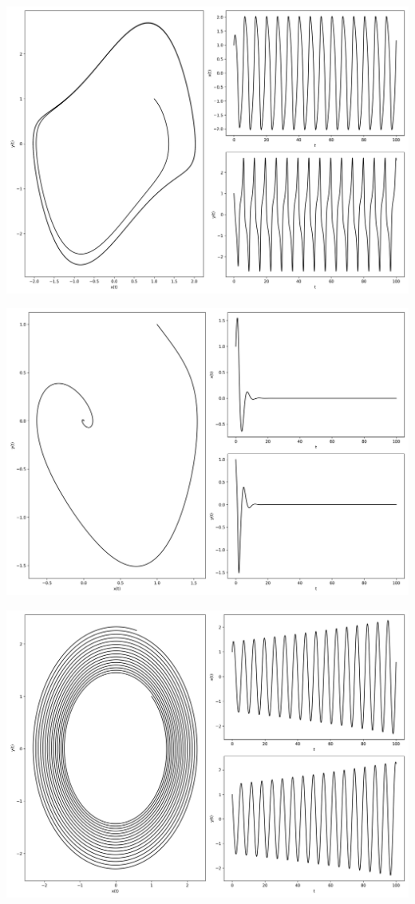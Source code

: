 \documentclass[12pt,a4paper]{jsarticle}
\makeatletter
\def\figcaption{\def\@captype{figure}\caption}
\makeatother
\begin{document}
\figcaption{$x_0=3.00, y_0=3.00, \mu=1,00, \omega=1.00, T = 200, N = 2000$}
\includegraphics[scale=0.33]{x1,0y1,0mu1,0omega1,0t1,00e+02n1,00e+04.png}
\figcaption{$x_0=1,00, y_0=1.00, \mu=1.00, \omega=1.00, T = 100, N = 10000$}
\includegraphics[scale=0.33]{x1,0y1,0mu-1,0omega1,0t1,00e+02n1,00e+04.png}
\figcaption{$x_0=1,00, y_0=1.00, \mu=-1.00, \omega=1.00, T = 100, N = 10000$}
\includegraphics[scale=0.33]{x1,0y1,0mu0,0omega1,0t1,00e+02n1,00e+04.png}
\end{document}
